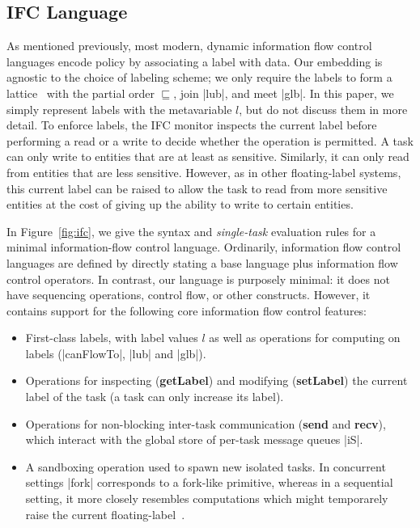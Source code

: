 \subsection{IFC Language}

As mentioned previously, most modern, dynamic information flow control
languages encode policy by associating a label with data.  Our
embedding is agnostic to the choice of labeling scheme; we only require
the labels to form a lattice~\cite{Denning:1976:LMS:360051.360056} with
the partial order $\sqsubseteq$, join |lub|, and meet |glb|.  In this
paper, we simply represent labels with the metavariable $l$, but do not
discuss them in more detail.
%
To enforce labels, the IFC monitor inspects the
current label  before performing a read or a write to decide whether the operation is permitted.
%
A task can only write to entities that are at least as sensitive.
%
Similarly, it can only read from entities that are less sensitive.
%
However, as in other floating-label systems, this current label can be raised
to allow the task to read from more sensitive entities at the cost of giving up
the ability to write to certain entities.

In Figure~\ref{fig:ifc}, we give the syntax and \emph{single-task}
evaluation rules for a minimal information-flow control language.
Ordinarily, information flow control languages are defined by directly
stating a base language plus information flow control operators.  In
contrast, our language is purposely minimal: it does not have sequencing
operations, control flow, or other constructs.  However, it contains
support for the following core information flow control features:

\begin{itemize}
    \item First-class labels, with label values $l$ as well as operations for computing on
labels (|canFlowTo|, |lub| and |glb|).
    \item Operations for inspecting (\textbf{getLabel}) and modifying
    (\textbf{setLabel}) the current label of the task (a task can only increase its label).
    \item Operations for non-blocking inter-task communication (\textbf{send}
    and \textbf{recv}), which interact with the global store of per-task
    message queues |iS|.
    \item A sandboxing operation used to spawn new isolated tasks. In
    concurrent settings |fork| corresponds to a fork-like primitive,
    whereas in a
    sequential setting, it more closely resembles
    computations which might temporarely raise the current
    floating-label~\cite{lio,Hritcu:2013:YIB:2497621.2498098}.

\end{itemize}

